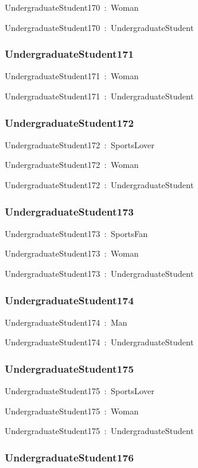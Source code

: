 \documentclass{article}
\begin{document}
UndergraduateStudent170~:~Woman

UndergraduateStudent170~:~UndergraduateStudent

\subsubsection*{UndergraduateStudent171}

UndergraduateStudent171~:~Woman

UndergraduateStudent171~:~UndergraduateStudent

\subsubsection*{UndergraduateStudent172}

UndergraduateStudent172~:~SportsLover

UndergraduateStudent172~:~Woman

UndergraduateStudent172~:~UndergraduateStudent

\subsubsection*{UndergraduateStudent173}

UndergraduateStudent173~:~SportsFan

UndergraduateStudent173~:~Woman

UndergraduateStudent173~:~UndergraduateStudent

\subsubsection*{UndergraduateStudent174}

UndergraduateStudent174~:~Man

UndergraduateStudent174~:~UndergraduateStudent

\subsubsection*{UndergraduateStudent175}

UndergraduateStudent175~:~SportsLover

UndergraduateStudent175~:~Woman

UndergraduateStudent175~:~UndergraduateStudent

\subsubsection*{UndergraduateStudent176}
\end{document}
